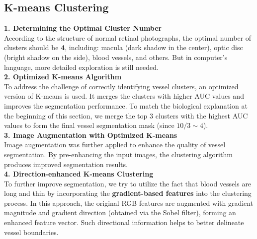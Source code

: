 \documentclass[final]{article}
\begin{document}
\subsection{K-means Clustering}
\textbf{1. Determining the Optimal Cluster Number} \\
According to the structure of normal retinal photographs, the optimal number of clusters should be \textbf{4}, including: macula (dark shadow in the center), optic disc (bright shadow on the side), blood vessels, and others. But in computer's language, more detailed exploration is still needed. \\
\textbf{2. Optimized K-means Algorithm} \\
To address the challenge of correctly identifying vessel clusters, an optimized version of K-means is used. It merges the clusters with higher AUC values and improves the segmentation performance. To match the biological explanation at the beginning of this section, we merge the top 3 clusters with the highest AUC values to form the final vessel segmentation mask (since $10/3 \sim 4$).\\
\textbf{3. Image Augmentation with Optimized K-means} \\
Image augmentation was further applied to enhance the quality of vessel segmentation. By pre-enhancing the input images, the clustering algorithm produces improved segmentation results. \\
\textbf{4. Direction-enhanced K-means Clustering} \\
To further improve segmentation, we try to utilize the fact that blood vessels are long and thin by incorporating the \textbf{gradient-based features} into the clustering process. In this approach, the original RGB features are augmented with gradient magnitude and gradient direction (obtained via the Sobel filter), forming an enhanced feature vector. Such directional information helps to better delineate vessel boundaries.
\end{document}
